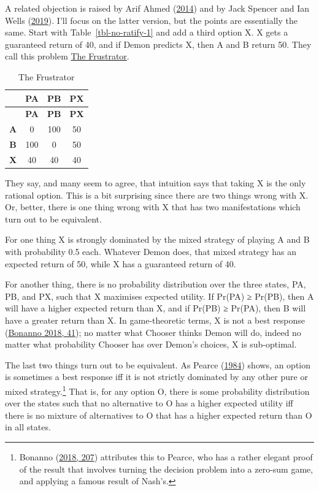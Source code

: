 \documentclass[
  12pt,
  letterpaper,
  DIV=11,
  numbers=noendperiod]{scrreprt}
\begin{document}
A related objection is raised by Arif Ahmed
(\protect\hyperlink{ref-Ahmed2014a}{2014}) and by Jack Spencer and Ian
Wells (\protect\hyperlink{ref-SpencerWells2019}{2019}). I'll focus on
the latter version, but the points are essentially the same. Start with
Table~\ref{tbl-no-ratify-1} and add a third option X. X gets a
guaranteed return of 40, and if Demon predicts X, then A and B return
50. They call this problem \protect\hyperlink{tbl-frustrator}{The
Frustrator}.

\hypertarget{tbl-frustrator}{}
\begin{longtable}[]{@{}cccc@{}}
\caption{\label{tbl-frustrator}The Frustrator}\tabularnewline
\toprule\noalign{}
& \textbf{PA} & \textbf{PB} & \textbf{PX} \\
\midrule\noalign{}
\endfirsthead
\toprule\noalign{}
& \textbf{PA} & \textbf{PB} & \textbf{PX} \\
\midrule\noalign{}
\endhead
\bottomrule\noalign{}
\endlastfoot
\textbf{A} & 0 & 100 & 50 \\
\textbf{B} & 100 & 0 & 50 \\
\textbf{X} & 40 & 40 & 40 \\
\end{longtable}

They say, and many seem to agree, that intuition says that taking X is
the only rational option. This is a bit surprising since there are two
things wrong with X. Or, better, there is one thing wrong with X that
has two manifestations which turn out to be equivalent.

For one thing X is strongly dominated by the mixed strategy of playing A
and B with probability 0.5 each. Whatever Demon does, that mixed
strategy has an expected return of 50, while X has a guaranteed return
of 40.

For another thing, there is no probability distribution over the three
states, PA, PB, and PX, such that X maximises expected utility. If
Pr(PA) ≥ Pr(PB), then A will have a higher expected return than X, and
if Pr(PB) ≥ Pr(PA), then B will have a greater return than X. In
game-theoretic terms, X is not a best response
(\protect\hyperlink{ref-Bonanno2018}{Bonanno 2018, 41}); no matter what
Chooser thinks Demon will do, indeed no matter what probability Chooser
has over Demon's choices, X is sub-optimal.

The last two things turn out to be equivalent. As Pearce
(\protect\hyperlink{ref-Pearce1984}{1984}) shows, an option is sometimes
a best response iff it is not strictly dominated by any other pure or
mixed strategy.\footnote{Bonanno
  (\protect\hyperlink{ref-Bonanno2018}{2018, 207}) attributes this to
  Pearce, who has a rather elegant proof of the result that involves
  turning the decision problem into a zero-sum game, and applying a
  famous result of Nash's.} That is, for any option O, there is some
probability distribution over the states such that no alternative to O
has a higher expected utility iff there is no mixture of alternatives to
O that has a higher expected return than O in all states.
\end{document}
